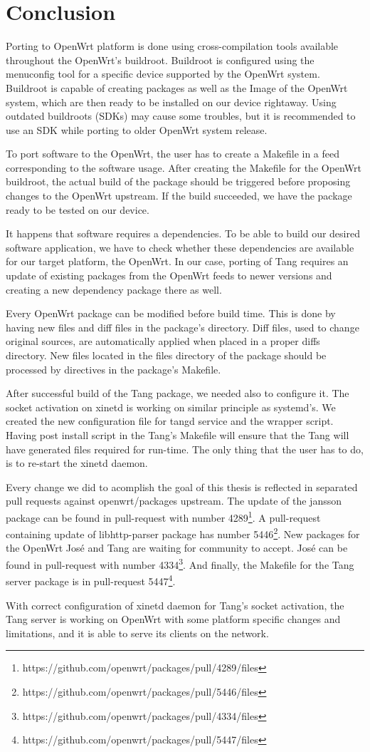 \chapter{Conclusion}\label{conlusion}


Porting to OpenWrt platform is done using cross-compilation tools available throughout the OpenWrt's buildroot.
Buildroot is configured using the menuconfig tool for a specific device supported by the OpenWrt system.
Buildroot is capable of creating packages as well as the Image of the OpenWrt system, which are then ready to be installed on our device rightaway.
Using outdated buildroots (SDKs) may cause some troubles, but it is recommended to use an SDK while porting to older OpenWrt system release.

To port software to the OpenWrt, the user has to create a Makefile in a feed corresponding to the software usage.
After creating the Makefile for the OpenWrt buildroot, the actual build of the package should be triggered before proposing changes to the OpenWrt upstream.
If the build succeeded, we have the package ready to be tested on our device.

It happens that software requires a dependencies.
To be able to build our desired software application, we have to check whether these dependencies are available for our target platform, the OpenWrt.
In our case, porting of Tang requires an update of existing packages from the OpenWrt feeds to newer versions and creating a new dependency package there as well.

Every OpenWrt package can be modified before build time.
This is done by having new files and diff files in the package's directory.
Diff files, used to change original sources, are automatically applied when placed in a proper diffs directory.
New files located in the files directory of the package should be processed by directives in the package's Makefile.

After successful build of the Tang package, we needed also to configure it.
The socket activation on xinetd is working on similar principle as systemd's.
We created the new configuration file for tangd service and the wrapper script.
Having post install script in the Tang's Makefile will ensure that the Tang will have generated files required for run-time.
The only thing that the user has to do, is to re-start the xinetd daemon.

Every change we did to acomplish the goal of this thesis is reflected in separated pull requests against openwrt/packages upstream.
The update of the jansson package can be found in pull-request with number 4289\footnote{https://github.com/openwrt/packages/pull/4289/files}.
A pull-request containing update of libhttp-parser package has number 5446\footnote{https://github.com/openwrt/packages/pull/5446/files}.
New packages for the OpenWrt José and Tang are waiting for community to accept.
José can be found in pull-request with number 4334\footnote{https://github.com/openwrt/packages/pull/4334/files}.
And finally, the Makefile for the Tang server package is in pull-request 5447\footnote{https://github.com/openwrt/packages/pull/5447/files}.

With correct configuration of xinetd daemon for Tang's socket activation, the Tang server is working on OpenWrt with some platform specific changes and limitations, and it is able to serve its clients on the network.
